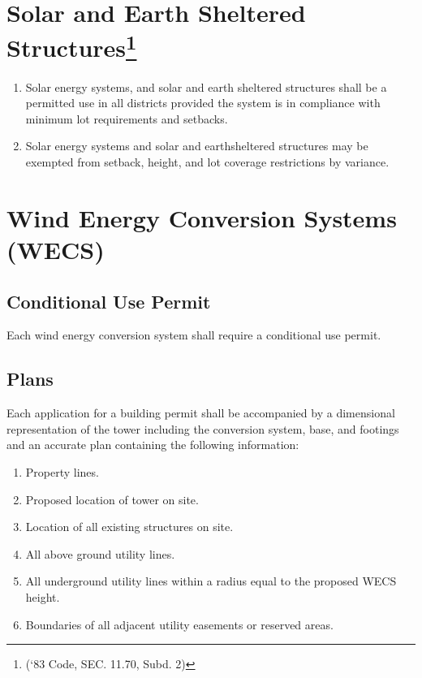 \section{Solar and Earth Sheltered Structures\footnote{(‘83 Code, SEC. 11.70, Subd. 2)}}
\begin{enumerate}[{\indent}A)]
    \item Solar energy systems, and solar and earth sheltered structures shall be a permitted use in all districts provided the system is in compliance with minimum lot requirements and setbacks.
    \item Solar energy systems and solar and earthsheltered structures may be exempted from setback, height, and lot coverage restrictions by variance.
\end{enumerate}

\section{Wind Energy Conversion Systems (WECS)}
\subsection{Conditional Use Permit}
Each wind energy conversion system shall require a conditional use permit.
\subsection{Plans}
Each application for a building permit shall be accompanied by a dimensional representation of the tower including the conversion system, base, and footings and an accurate plan containing the following information:
\begin{enumerate}[{\indent}1)]
    \item Property lines.
    \item Proposed location of tower on site.
    \item Location of all existing structures on site.
    \item All above ground utility lines.
    \item All underground utility lines within a radius equal to the proposed WECS height.
    \item Boundaries of all adjacent utility easements or reserved areas.
\end{enumerate}
